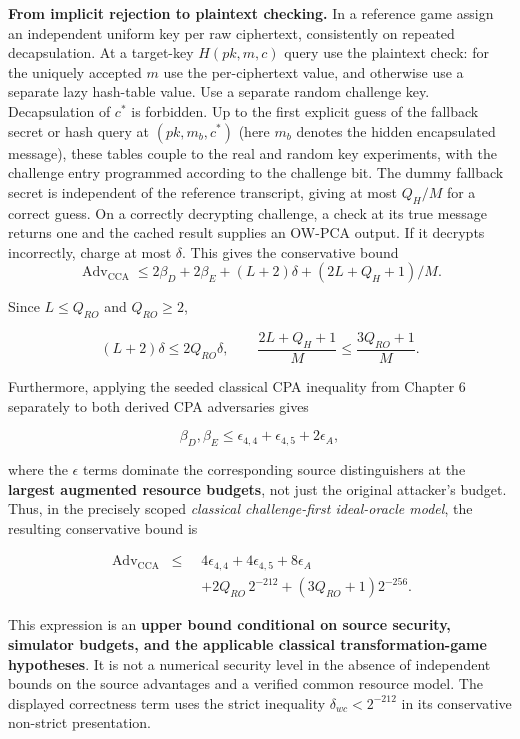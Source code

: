 \documentclass[
  11pt,
  a4paper,
  oneside]{report}
\begin{document}
\textbf{From implicit rejection to plaintext checking.} In a reference
game assign an independent uniform key per raw ciphertext, consistently
on repeated decapsulation. At a target-key \(H(pk,m,c)\) query use the
plaintext check: for the uniquely accepted \(m\) use the per-ciphertext
value, and otherwise use a separate lazy hash-table value. Use a
separate random challenge key. Decapsulation of \(c^*\) is forbidden. Up
to the first explicit guess of the fallback secret or hash query at
\((pk,m_b,c^*)\) (here \(m_b\) denotes the hidden encapsulated message),
these tables couple to the real and random key experiments, with the
challenge entry programmed according to the challenge bit. The dummy
fallback secret is independent of the reference transcript, giving at
most \(Q_H/M\) for a correct guess. On a correctly decrypting challenge,
a check at its true message returns one and the cached result supplies
an OW-PCA output. If it decrypts incorrectly, charge at most \(\delta\).
This gives the conservative bound \[
\operatorname{Adv}_{\mathrm{CCA}}\le 2\beta_D+2\beta_E+(L+2)\delta+(2L+Q_H+1)/M.
\]

Since \(L\le Q_{RO}\) and \(Q_{RO}\ge2\),

\[
(L+2)\delta\le2Q_{RO}\delta,
\qquad
\frac{2L+Q_H+1}{M}\le\frac{3Q_{RO}+1}{M}.
\]

Furthermore, applying the seeded classical CPA inequality from Chapter 6
separately to both derived CPA adversaries gives

\[
\beta_D,\beta_E\le
\epsilon_{4,4}+\epsilon_{4,5}+2\epsilon_A,
\]

where the \(\epsilon\) terms dominate the corresponding source
distinguishers at the \textbf{largest augmented resource budgets}, not
just the original attacker's budget. Thus, in the precisely scoped
\emph{classical challenge-first ideal-oracle model}, the resulting
conservative bound is

\[
\boxed{\begin{aligned}
\operatorname{Adv}_{\mathrm{CCA}}
\;\le\;&4\epsilon_{4,4}+4\epsilon_{4,5}+8\epsilon_A\\
&+2Q_{RO}\,2^{-212}
+(3Q_{RO}+1)2^{-256}.
\end{aligned}}
\]

This expression is an \textbf{upper bound conditional on source
security, simulator budgets, and the applicable classical
transformation-game hypotheses}. It is not a numerical security level in
the absence of independent bounds on the source advantages and a
verified common resource model. The displayed correctness term uses the
strict inequality \(\delta_{wc}<2^{-212}\) in its conservative
non-strict presentation.
\end{document}
